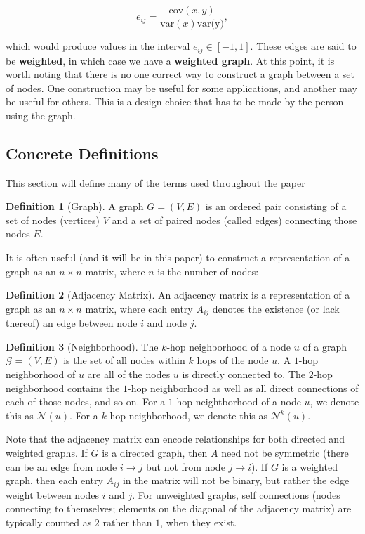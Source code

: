 \documentclass{article}
\theoremstyle{definition}
\newtheorem{definition}{Definition}[section]
\begin{document}
\[
e_{ij} = \frac{\text{cov}(x,y)}{\text{var}(x) \text{var(y)}},
\]

which would produce values in the interval $e_{ij} \in [-1, 1]$. These edges are said to be \textbf{weighted}, in which case we have a \textbf{weighted graph}. At this point, it is worth noting that there is no one correct way to construct a graph between a set of nodes. One construction may be useful for some applications, and another may be useful for others. This is a design choice that has to be made by the person using the graph.

\subsection{Concrete Definitions}
\label{sec:definitions}

This section will define many of the terms used throughout the paper

\begin{definition}[Graph]
A graph $G = (V, E)$ is an ordered pair consisting of a set of nodes (vertices) $V$ and a set of paired nodes (called edges) connecting those nodes $E$.
\end{definition}

It is often useful (and it will be in this paper) to construct a representation of a graph as an $n \times n$ matrix, where $n$ is the number of nodes:

\begin{definition}[Adjacency Matrix]
An adjacency matrix is a representation of a graph as an $n \times n$ matrix, where each entry $A_{ij}$ denotes the existence (or lack thereof) an edge between node $i$ and node $j$. 
\end{definition}

\begin{definition}[Neighborhood]
The $k$-hop neighborhood of a node $u$ of a graph $\mathcal{G} = (V, E)$ is the set of all nodes within $k$ hops of the node $u$. A $1$-hop neighborhood of $u$ are all of the nodes $u$ is directly connected to. The $2$-hop neighborhood contains the $1$-hop neighborhood as well as all direct connections of each of those nodes, and so on. For a $1$-hop neightborhood of a node $u$, we denote this as $\mathcal{N}(u)$. For a $k$-hop neighborhood, we denote this as $\mathcal{N}^k(u)$.
\end{definition}

Note that the adjacency matrix can encode relationships for both directed and weighted graphs. If $G$ is a directed graph, then $A$ need not be symmetric (there can be an edge from node $i \rightarrow j$ but not from node $j \rightarrow i$). If $G$ is a weighted graph, then each entry $A_{ij}$ in the matrix will not be binary, but rather the edge weight between nodes $i$ and $j$. For unweighted graphs, self connections (nodes connecting to themselves; elements on the diagonal of the adjacency matrix) are typically counted as $2$ rather than $1$, when they exist.
\end{document}
